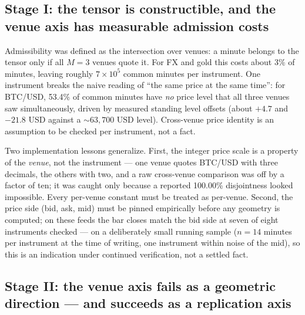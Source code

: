\documentclass[11pt,a4paper]{article}
\numberwithin{equation}{section}
\begin{document}
\subsection{Stage I: the tensor is constructible, and the venue
axis has measurable admission costs}

Admissibility was defined as the intersection over venues: a minute
belongs to the tensor only if all $M=3$ venues quote it. For FX and
gold this costs about 3\% of minutes, leaving roughly $7\times10^5$
common minutes per instrument. One instrument breaks the naive
reading of ``the same price at the same time'': for BTC/USD, 53.4\%
of common minutes have \emph{no} price level that all three venues
saw simultaneously, driven by measured standing level offsets
(about $+4.7$ and $-21.8$ USD against a $\sim63{,}700$ USD level).
Cross-venue price identity is an assumption to be checked per
instrument, not a fact.

Two implementation lessons generalize. First, the integer price
scale is a property of the \emph{venue}, not the instrument --- one
venue quotes BTC/USD with three decimals, the others with two, and
a raw cross-venue comparison was off by a factor of ten; it was
caught only because a reported 100.00\% disjointness looked
impossible. Every per-venue constant must be treated as per-venue.
Second, the price side (bid, ask, mid) must be pinned empirically
before any geometry is computed; on these feeds the bar closes
match the bid side at seven of eight instruments checked --- on a
deliberately small running sample ($n=14$ minutes per instrument at
the time of writing, one instrument within noise of the mid), so
this is an indication under continued verification, not a settled
fact.

\subsection{Stage II: the venue axis fails as a geometric
direction --- and succeeds as a replication axis}
\end{document}
